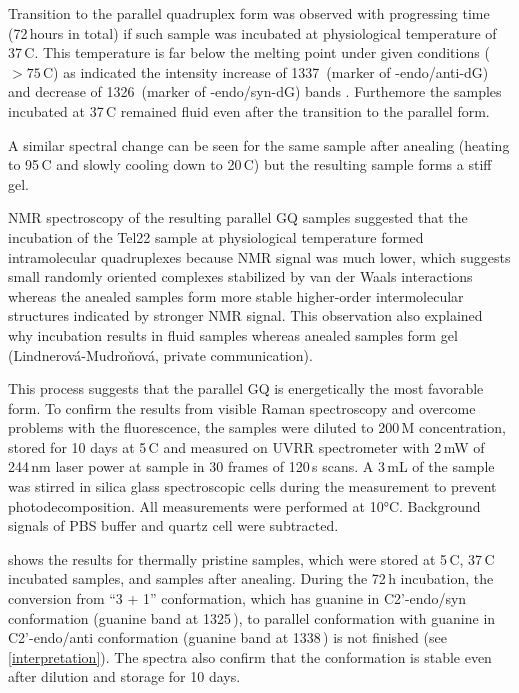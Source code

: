 Transition to the parallel quadruplex form was observed with progressing time
(72\,hours in total) if such sample was incubated at physiological temperature
of 37\,\textdegree{}C.
This temperature is far below the melting point under given
conditions ($> 75$\,\textdegree{}C) as indicated the intensity increase of
1337\,\icm{} (marker of -endo/anti-dG) and decrease of
1326\,\icm{} (marker of -endo/syn-dG) bands
\parencite{%
	Nishimura1986b,%
	Benevides1988a,%
	Miura1994,%
	Miura1995,%
	Miura1995a,%
	Krafft2002%
}.
Furthemore the samples incubated at 37\,\textdegree{}C remained fluid even
after the transition to the parallel form.

A similar spectral change can be seen for the same sample after anealing
(heating to 95\,\textdegree{}C and slowly cooling down to 20\,\textdegree{}C)
but the resulting sample forms a stiff gel.

NMR spectroscopy of the resulting parallel GQ samples suggested that the
incubation of the Tel22 sample at physiological temperature formed
intramolecular quadruplexes because NMR signal was much lower, which suggests
small randomly oriented complexes stabilized by van der Waals interactions
whereas the anealed samples form more stable higher-order intermolecular
structures indicated by stronger NMR signal.
This observation also explained why incubation results in fluid samples whereas
anealed samples form gel (Lindnerová-Mudroňová, private communication).

This process suggests that the parallel GQ is energetically the most favorable
form.
To confirm the results from visible Raman spectroscopy and overcome problems
with the fluorescence, the samples were diluted to 200\,M concentration,
stored for 10 days at 5\,\textdegree{}C and measured on UVRR spectrometer with
2\,mW of 244\,nm laser power at sample in 30 frames of 120\,s scans.
A 3\,mL of the sample was stirred in silica glass spectroscopic cells during
the measurement to prevent photodecomposition.
All measurements were performed at 10°C.
Background signals of PBS buffer and quartz cell were subtracted.

 shows the results for thermally pristine samples,
which were stored at 5\,\textdegree{}C, 37\,\textdegree{}C incubated samples,
and samples after anealing.
During the 72\,h incubation, the conversion from “3 + 1” conformation, which
has guanine in C2'-endo/syn conformation (guanine band at 1325\,\icm{}), to
parallel conformation with guanine in C2'-endo/anti conformation (guanine
band at 1338\,\icm{}) is not finished (see \cref{interpretation}).
The spectra also confirm that the conformation is stable even after dilution
and storage for 10 days.

